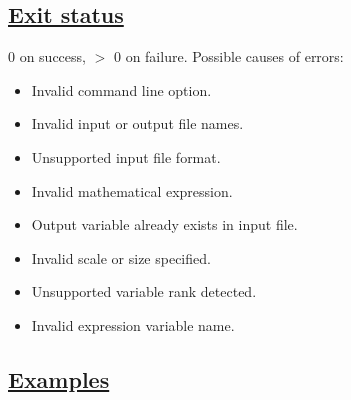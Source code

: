 \subsection*{\underline{Exit status}}


  0 on success, $>$ 0 on failure. Possible causes of errors: \begin{itemize}
\item  Invalid command line option. 
\item  Invalid input or output file names. 
\item  Unsupported input file format. 
\item  Invalid mathematical expression. 
\item  Output variable already exists in input file. 
\item  Invalid scale or size specified. 
\item  Unsupported variable rank detected. 
\item  Invalid expression variable name. 

\end{itemize}

\subsection*{\underline{Examples}}


